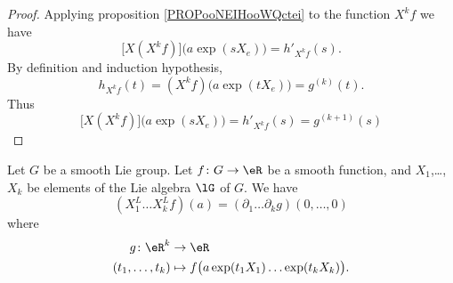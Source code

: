 \begin{theorem}
\begin{proof}
	Applying proposition \ref{PROPooNEIHooWQctei} to the function \( X^kf\) we have
	\begin{equation}
		\big[ X(X^kf) \big]\big( a\exp(sX_e) \big)=h'_{X^kf}(s).
	\end{equation}
	By definition and induction hypothesis,
	\begin{equation}
		h_{X^kf}(t)=(X^kf)\big( a\exp(tX_e) \big)=g^{(k)}(t).
	\end{equation}
	Thus
	\begin{equation}
		\big[ X(X^kf) \big]\big( a\exp(sX_e) \big)=h'_{X^kf}(s)=g^{(k+1)}(s)
	\end{equation}
\end{proof}

\begin{proposition}	\label{PROPooXCMUooJqsTvB}
	Let \( G\) be a smooth Lie group. Let \(f \colon G\to \eR  \) be a smooth function, and \( X_1\),\ldots, \( X_k\) be elements of the Lie algebra \( \lG\) of \( G\). We have
	\begin{equation}
		(X_1^L\ldots X_k^Lf)(a)=(\partial_1\ldots\partial_kg)(0,\ldots,0)
	\end{equation}
	where
	\begin{equation}
		\begin{aligned}
			g\colon \eR^k    & \to \eR                                                \\
			(t_1,\ldots,t_k) & \mapsto f\big( a\exp(t_1X_1)\ldots \exp(t_kX_k) \big).
		\end{aligned}
	\end{equation}
\end{proposition}


\end{theorem}
